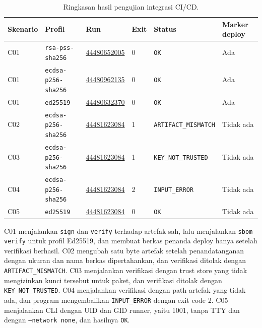 \begin{table}[H]
\centering
{\footnotesize
\begin{tabular}{@{}p{1.6cm}p{3.3cm}p{2.5cm}p{0.9cm}p{4.1cm}p{2.5cm}@{}}
\toprule
Skenario & Profil & Run & Exit & Status & Marker deploy \\
\midrule
C01 & \texttt{rsa-pss-sha256} & \href{https://github.com/AnmategraKMITB/Anmategra-APP/actions/runs/44480652005}{44480652005} & 0 & \texttt{OK} & Ada \\
C01 & \texttt{ecdsa-p256-sha256} & \href{https://github.com/AnmategraKMITB/Anmategra-APP/actions/runs/44480962135}{44480962135} & 0 & \texttt{OK} & Ada \\
C01 & \texttt{ed25519} & \href{https://github.com/AnmategraKMITB/Anmategra-APP/actions/runs/44480632370}{44480632370} & 0 & \texttt{OK} & Ada \\
C02 & \texttt{ecdsa-p256-sha256} & \href{https://github.com/AnmategraKMITB/Anmategra-APP/actions/runs/44481623084}{44481623084} & 1 & \texttt{ARTIFACT\_MISMATCH} & Tidak ada \\
C03 & \texttt{ecdsa-p256-sha256} & \href{https://github.com/AnmategraKMITB/Anmategra-APP/actions/runs/44481623084}{44481623084} & 1 & \texttt{KEY\_NOT\_TRUSTED} & Tidak ada \\
C04 & \texttt{ecdsa-p256-sha256} & \href{https://github.com/AnmategraKMITB/Anmategra-APP/actions/runs/44481623084}{44481623084} & 2 & \texttt{INPUT\_ERROR} & Tidak ada \\
C05 & \texttt{ed25519} & \href{https://github.com/AnmategraKMITB/Anmategra-APP/actions/runs/44481623084}{44481623084} & 0 & \texttt{OK} & Tidak ada \\
\bottomrule
\end{tabular}}
\caption{Ringkasan hasil pengujian integrasi CI/CD.}
\label{tab:ci-evidence}
\end{table}

C01 menjalankan \texttt{sign} dan \texttt{verify} terhadap artefak sah, lalu menjalankan
\texttt{sbom verify} untuk profil Ed25519, dan membuat berkas penanda deploy hanya setelah
verifikasi berhasil. C02 mengubah satu byte artefak setelah penandatanganan dengan ukuran dan nama
berkas dipertahankan, dan verifikasi ditolak dengan \texttt{ARTIFACT\_MISMATCH}. C03 menjalankan
verifikasi dengan trust store yang tidak mengizinkan kunci tersebut untuk paket, dan verifikasi
ditolak dengan \texttt{KEY\_NOT\_TRUSTED}. C04 menjalankan verifikasi dengan path artefak yang
tidak ada, dan program mengembalikan \texttt{INPUT\_ERROR} dengan exit code 2. C05 menjalankan CLI
dengan UID dan GID runner, yaitu 1001, tanpa TTY dan dengan \texttt{--network none}, dan
hasilnya \texttt{OK}.

